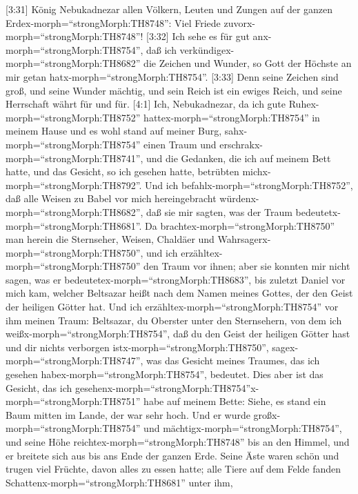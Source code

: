  {[}3:31{]} König Nebukadnezar allen Völkern, Leuten und
Zungen auf der ganzen Erdex-morph=``strongMorph:TH8748'': Viel Friede
zuvorx-morph=``strongMorph:TH8748''!  {[}3:32{]} Ich sehe es
für gut anx-morph=``strongMorph:TH8754'', daß ich
verkündigex-morph=``strongMorph:TH8682'' die Zeichen und Wunder, so Gott
der Höchste an mir getan hatx-morph=``strongMorph:TH8754''. 
{[}3:33{]} Denn seine Zeichen sind groß, und seine Wunder mächtig, und
sein Reich ist ein ewiges Reich, und seine Herrschaft währt für und für.
 {[}4:1{]} Ich, Nebukadnezar, da ich gute
Ruhex-morph=``strongMorph:TH8752'' hattex-morph=``strongMorph:TH8754''
in meinem Hause und es wohl stand auf meiner Burg, 
sahx-morph=``strongMorph:TH8754'' einen Traum und
erschrakx-morph=``strongMorph:TH8741'', und die Gedanken, die ich auf
meinem Bett hatte, und das Gesicht, so ich gesehen hatte, betrübten
michx-morph=``strongMorph:TH8792''.  Und ich
befahlx-morph=``strongMorph:TH8752'', daß alle Weisen zu Babel vor mich
hereingebracht würdenx-morph=``strongMorph:TH8682'', daß sie mir sagten,
was der Traum bedeutetx-morph=``strongMorph:TH8681''.  Da
brachtex-morph=``strongMorph:TH8750'' man herein die Sternseher, Weisen,
Chaldäer und Wahrsagerx-morph=``strongMorph:TH8750'', und ich
erzähltex-morph=``strongMorph:TH8750'' den Traum vor ihnen; aber sie
konnten mir nicht sagen, was er bedeutetex-morph=``strongMorph:TH8683'',
 bis zuletzt Daniel vor mich kam, welcher Beltsazar heißt
nach dem Namen meines Gottes, der den Geist der heiligen Götter hat. Und
ich erzähltex-morph=``strongMorph:TH8754'' vor ihm meinen Traum:
 Beltsazar, du Oberster unter den Sternsehern, von dem ich
weißx-morph=``strongMorph:TH8754'', daß du den Geist der heiligen Götter
hast und dir nichts verborgen istx-morph=``strongMorph:TH8750'',
sagex-morph=``strongMorph:TH8747'', was das Gesicht meines Traumes, das
ich gesehen habex-morph=``strongMorph:TH8754'', bedeutet. 
Dies aber ist das Gesicht, das ich
gesehenx-morph=``strongMorph:TH8754''x-morph=``strongMorph:TH8751'' habe
auf meinem Bette: Siehe, es stand ein Baum mitten im Lande, der war sehr
hoch.  Und er wurde großx-morph=``strongMorph:TH8754'' und
mächtigx-morph=``strongMorph:TH8754'', und seine Höhe
reichtex-morph=``strongMorph:TH8748'' bis an den Himmel, und er breitete
sich aus bis ans Ende der ganzen Erde.  Seine Äste waren
schön und trugen viel Früchte, davon alles zu essen hatte; alle Tiere
auf dem Felde fanden Schattenx-morph=``strongMorph:TH8681'' unter ihm,
